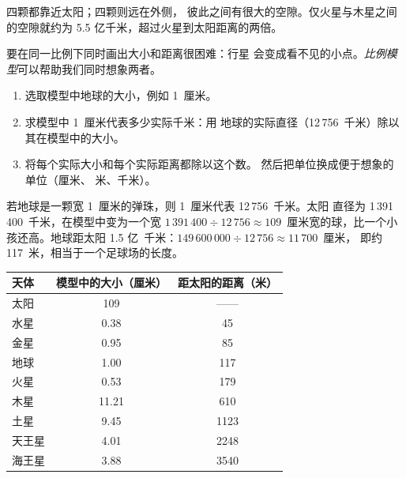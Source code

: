 四颗都靠近太阳；四颗则远在外侧，
彼此之间有很大的空隙。仅火星与木星之间的空隙就约为 5.5 亿千米，超过火星到太阳距离的两倍。

要在同一比例下同时画出大小和距离很困难：行星
会变成看不见的小点。\emph{比例模型}可以帮助我们同时想象两者。

\begin{method}[制作太阳系的比例模型]\label{met:g6:earth-a-planet:scale-model}
\begin{enumerate}
  \item 选取模型中地球的大小，例如 1~厘米。
  \item 求模型中 1~厘米代表多少实际千米：用
        地球的实际直径（12\,756~千米）除以其在模型中的大小。
  \item 将每个实际大小和每个实际距离都除以这个数。
        然后把单位换成便于想象的单位（厘米、
        米、千米）。
\end{enumerate}
\end{method}

\begin{example}[地球是一颗弹珠]\label{ex:g6:earth-a-planet:marble}
若地球是一颗宽 1~厘米的弹珠，则 1~厘米代表 12\,756~千米。太阳
直径为 1\,391\,400~千米，在模型中变为一个宽 $1\,391\,400 \div 12\,756 \approx
109$~厘米宽的球，比一个小孩还高。地球距太阳
1.5 亿~千米：$149\,600\,000 \div 12\,756 \approx 11\,700$~厘米，
即约 117~米，相当于一个足球场的长度。
\end{example}

\begin{center}\small
\begin{tabular}{|l|c|c|}
\hline
\textbf{天体} & \textbf{模型中的大小（厘米）} & \textbf{距太阳的距离（米）} \\
\hline
太阳 & 109 &——\\
水星 & 0.38 & 45 \\
金星 & 0.95 & 85 \\
地球 & 1.00 & 117 \\
火星 & 0.53 & 179 \\
木星 & 11.21 & 610 \\
土星 & 9.45 & 1123 \\
天王星 & 4.01 & 2248 \\
海王星 & 3.88 & 3540 \\
\hline
\end{tabular}
\end{center}

